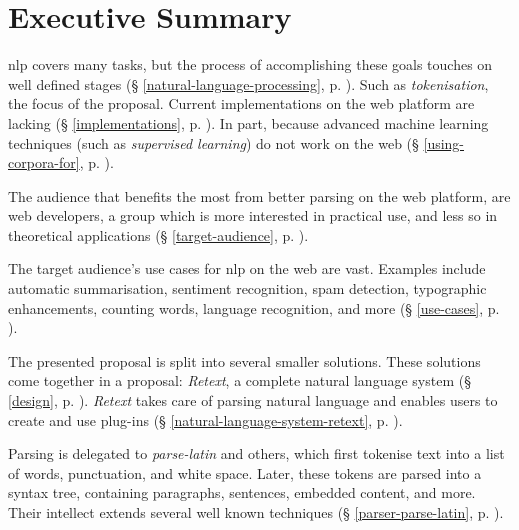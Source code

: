 
\begingroup
\let\clearpage\relax
\let\cleardoublepage\relax
\let\cleardoublepage\relax

\chapter*{Executive Summary}

\gls{nlp} covers many tasks, but the process of accomplishing
  these goals touches on well defined stages
  (§ \ref{natural-language-processing},
  p. \pageref{natural-language-processing}).
Such as \emph{tokenisation}, the focus of the proposal.
Current implementations on the web platform are lacking
  (§ \ref{implementations}, p. \pageref{implementations}).
In part, because advanced machine learning techniques (such as
  \emph{supervised learning}) do not work on the web
  (§ \ref{using-corpora-for}, p. \pageref{using-corpora-for}).

The audience that benefits the most from better parsing on the web platform,
  are web developers, a group which is more interested in practical use, and
  less so in theoretical applications
  (§ \ref{target-audience}, p. \pageref{target-audience}).

The target audience's use cases for \gls{nlp} on the web are vast. Examples
  include automatic summarisation, sentiment recognition, spam detection,
  typographic enhancements, counting words, language recognition, and more
  (§ \ref{use-cases}, p. \pageref{use-cases}).

The presented proposal is split into several smaller solutions.
These solutions come together in a proposal: \emph{Retext}, a complete
  natural language system (§ \ref{design}, p. \pageref{design}).
\emph{Retext} takes care of parsing natural language and enables users to
  create and use plug-ins (§ \ref{natural-language-system-retext},
  p. \pageref{natural-language-system-retext}).

Parsing is delegated to \emph{parse-latin} and others, which first tokenise
  text into a list of words, punctuation, and white space. Later, these
  tokens are parsed into a syntax tree, containing paragraphs, sentences,
  embedded content, and more. Their intellect extends several well known
  techniques (§ \ref{parser-parse-latin}, p. \pageref{parser-parse-latin}).

